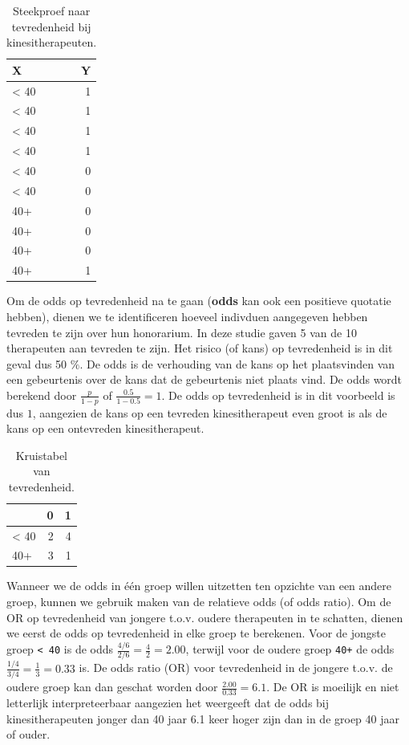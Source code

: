 \documentclass[
]{book}
\theoremstyle{definition}
\theoremstyle{definition}
\theoremstyle{definition}
\theoremstyle{definition}
\theoremstyle{remark}
\begin{document}
\begin{table}

\caption{\label{tab:unnamed-chunk-17}Steekproef naar tevredenheid bij kinesitherapeuten.}
\centering
\begin{tabular}[t]{lr}
\toprule
X & Y\\
\midrule
< 40 & 1\\
< 40 & 1\\
< 40 & 1\\
< 40 & 1\\
< 40 & 0\\
\addlinespace
< 40 & 0\\
40+ & 0\\
40+ & 0\\
40+ & 0\\
40+ & 1\\
\bottomrule
\end{tabular}
\end{table}

Om de odds op tevredenheid na te gaan (\textbf{odds} kan ook een positieve quotatie hebben), dienen we te identificeren hoeveel indivduen aangegeven hebben tevreden te zijn over hun honorarium. In deze studie gaven 5 van de 10 therapeuten aan tevreden te zijn. Het risico (of kans) op tevredenheid is in dit geval dus 50 \(\%\). De odds is de verhouding van de kans op het plaatsvinden van een gebeurtenis over de kans dat de gebeurtenis niet plaats vind. De odds wordt berekend door \(\frac{p}{1-p}\) of \(\frac{0.5}{1-0.5} = 1\). De odds op tevredenheid is in dit voorbeeld is dus \(1\), aangezien de kans op een tevreden kinesitherapeut even groot is als de kans op een ontevreden kinesitherapeut.

\begin{table}

\caption{\label{tab:unnamed-chunk-18}Kruistabel van tevredenheid.}
\centering
\begin{tabular}[t]{lrr}
\toprule
  & 0 & 1\\
\midrule
< 40 & 2 & 4\\
40+ & 3 & 1\\
\bottomrule
\end{tabular}
\end{table}

Wanneer we de odds in één groep willen uitzetten ten opzichte van een andere groep, kunnen we gebruik maken van de relatieve odds (of odds ratio). Om de OR op tevredenheid van jongere t.o.v. oudere therapeuten in te schatten, dienen we eerst de odds op tevredenheid in elke groep te berekenen. Voor de jongste groep \texttt{\textless{}\ 40} is de odds \(\frac{4/6}{2/6} = \frac{4}{2} = 2.00\), terwijl voor de oudere groep \texttt{40+} de odds \(\frac{1/4}{3/4} = \frac{1}{3} = 0.33\) is. De odds ratio (OR) voor tevredenheid in de jongere t.o.v. de oudere groep kan dan geschat worden door \(\frac{2.00}{0.33} = 6.1\). De OR is moeilijk en niet letterlijk interpreteerbaar aangezien het weergeeft dat de odds bij kinesitherapeuten jonger dan 40 jaar 6.1 keer hoger zijn dan in de groep 40 jaar of ouder.
\end{document}
